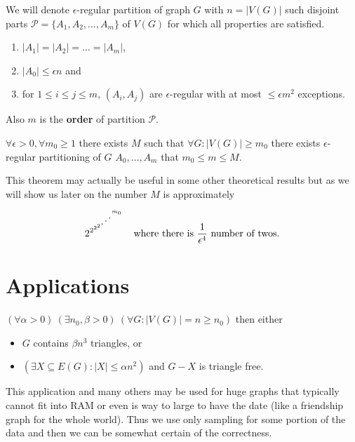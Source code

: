 \begin{defn}
	We will denote $\epsilon$-regular partition of graph $G$ with $n = |V(G)|$ such disjoint parts $\mathcal{P} = \{A_{1}, A_{2}, \dots, A_{m}\}$ of $V(G)$ for which all properties are satisfied.
	
	\begin{enumerate}
		\item $|A_1| = |A_2| = \dots = |A_m|$,
		\item $|A_0| \leq \epsilon n$ and
		\item for $1 \leq i \leq j \leq m$, $(A_i, A_j)$ are $\epsilon$-regular with at most $\leq \epsilon m^2$ exceptions.
	\end{enumerate}
	
	Also $m$ is the \textbf{order} of partition $\mathcal{P}$.
\end{defn}

\begin{thm}
	$\forall \epsilon > 0, \forall m_0 \geq 1$ there exists $M$ such that $\forall G : |V(G)| \geq m_0$ there exists $\epsilon$-regular partitioning of $G$ $A_0, \dots, A_m$ that $m_0 \leq m \leq M$.
\end{thm}

This theorem may actually be useful in some other theoretical results but as we will show us later on the number $M$ is approximately

$$
2^{2{^{2^{2^{\reflectbox{$\ddots$}^{m_0}}}}}} \quad \text{where there is } \frac{1}{\epsilon^4} \text{ number of twos.}
$$

\section{Applications}

\begin{lemma}
	$(\forall \alpha >0) \ (\exists n_0, \beta > 0) \ (\forall G : |V(G)| = n \geq n_0)$ then either
	
	\begin{itemize}
		\item $G$ contains $\beta n^3$ triangles, or
		\item $(\exists X \subseteq E(G): |X| \leq \alpha n^2)$ and $G-X$ is triangle free.
	\end{itemize}
\end{lemma}

This application and many others may be used for huge graphs that typically cannot fit into RAM or even is way to large to have the date (like a friendship graph for the whole world). Thus we use only sampling for some portion of the data and then we can be somewhat certain of the correctness.

